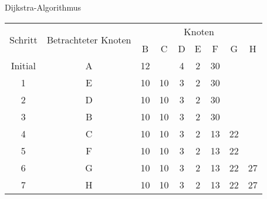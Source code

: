 \documentclass[german]{../spicker}
\begin{document}
\begin{example}{Dijkstra-Algorithmus}
\begin{center}
        \begin{tabular}{|c|c|c|c|c|c|c|c|c|}
            \hline
            \multirow{2}{*}{Schritt} & \multirow{2}{*}{Betrachteter Knoten} & \multicolumn{7}{c|}{Knoten}                             \\ \cline{3-9}
                                     &                                      & B                           & C  & D & E & F  & G  & H  \\
            \hline
            Initial                  & A                                    & 12                          &    & 4 & 2 & 30 &    &    \\
            1                        & E                                    & 10                          & 10 & 3 & 2 & 30 &    &    \\
            2                        & D                                    & 10                          & 10 & 3 & 2 & 30 &    &    \\
            3                        & B                                    & 10                          & 10 & 3 & 2 & 30 &    &    \\
            4                        & C                                    & 10                          & 10 & 3 & 2 & 13 & 22 &    \\
            5                        & F                                    & 10                          & 10 & 3 & 2 & 13 & 22 &    \\
            6                        & G                                    & 10                          & 10 & 3 & 2 & 13 & 22 & 27 \\
            7                        & H                                    & 10                          & 10 & 3 & 2 & 13 & 22 & 27 \\
            \hline
        \end{tabular}

        \vspace{1em}


\end{center}
\end{example}
\end{document}
